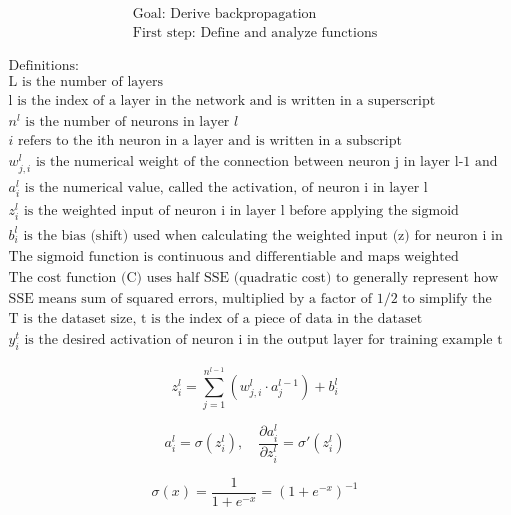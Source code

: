 \documentclass{article}
\begin{document}
\begin{gather*}
\text{Goal: Derive backpropagation} \\[0.5em]
\text{First step: Define and analyze functions}
\end{gather*}

\begin{gather*}
\text{Definitions:} \\[0.3em]
\text{L is the number of layers} \\[0.3em]
\text{l is the index of a layer in the network and is written in a superscript} \\[0.3em]
n^{l} \text{ is the number of neurons in layer } l \\[0.3em]
i \text{ refers to the ith neuron in a layer and is written in a subscript} \\[0.3em]
w_{j,i}^{l} \text{ is the numerical weight of the connection between neuron j in layer l-1 and neuron i in layer l} \\[0.3em]
a_{i}^{l} \text{ is the numerical value, called the activation, of neuron i in layer l} \\[0.3em]
z_{i}^{l} \text{ is the weighted input of neuron i in layer l before applying the sigmoid activation function} \\[0.3em]
b_{i}^{l} \text{ is the bias (shift) used when calculating the weighted input (z) for neuron i in layer l} \\[0.3em]
\text{The sigmoid function is continuous and differentiable and maps weighted inputs to an activation in the range (0, 1)} \\[0.3em]
\text{The cost function (C) uses half SSE (quadratic cost) to generally represent how the neural network is performing} \\[0.3em]
\text{SSE means sum of squared errors, multiplied by a factor of 1/2 to simplify the derivative} \\[0.3em]
\text{T is the dataset size, t is the index of a piece of data in the dataset} \\[0.3em]
y_{i}^{t} \text{ is the desired activation of neuron i in the output layer for training example t}
\end{gather*}

\[
z_{i}^{l} = \sum_{j=1}^{n^{l-1}}(w_{j,i}^{l} \cdot a_{j}^{l-1})+b_{i}^{l}
\]

\[
a_{i}^{l}=\sigma(z_{i}^{l}), \quad \frac{\partial a_{i}^{l}}{\partial z_{i}^{l}}=\sigma'(z_{i}^{l})
\]

\[
\sigma(x)=\frac{1}{1+e^{-x}}= (1+e^{-x})^{-1}
\]
\end{document}
